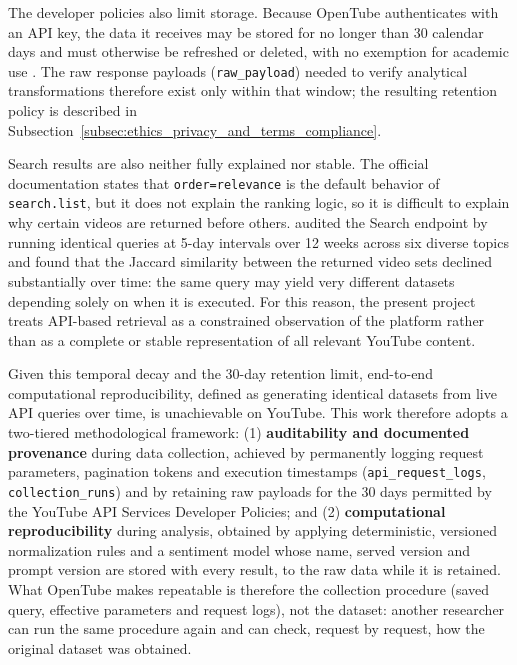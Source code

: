 The developer policies also limit storage. Because OpenTube authenticates with an API key, the data it receives may be stored for no longer than 30 calendar days and must otherwise be refreshed or deleted, with no exemption for academic use \autocite{youtube_api_services_developer_policies}. The raw response payloads (\texttt{raw\_payload}) needed to verify analytical transformations therefore exist only within that window; the resulting retention policy is described in Subsection~\ref{subsec:ethics_privacy_and_terms_compliance}.

Search results are also neither fully explained nor stable. The official documentation states that \texttt{order=relevance} is the default behavior of \texttt{search.\allowbreak list}, but it does not explain the ranking logic, so it is difficult to explain why certain videos are returned before others. \textcite{efstratiou2025youtube} audited the Search endpoint by running identical queries at 5-day intervals over 12 weeks across six diverse topics and found that the Jaccard similarity between the returned video sets declined substantially over time: the same query may yield very different datasets depending solely on when it is executed. For this reason, the present project treats API-based retrieval as a constrained observation of the platform rather than as a complete or stable representation of all relevant YouTube content.

Given this temporal decay and the 30-day retention limit, end-to-end computational reproducibility, defined as generating identical datasets from live API queries over time, is unachievable on YouTube. This work therefore adopts a two-tiered methodological framework: (1) \textbf{auditability and documented provenance} during data collection, achieved by permanently logging request parameters, pagination tokens and execution timestamps (\texttt{api\_request\_logs}, \texttt{collection\_runs}) and by retaining raw payloads for the 30 days permitted by the YouTube API Services Developer Policies; and (2) \textbf{computational reproducibility} during analysis, obtained by applying deterministic, versioned normalization rules and a sentiment model whose name, served version and prompt version are stored with every result, to the raw data while it is retained. What OpenTube makes repeatable is therefore the collection procedure (saved query, effective parameters and request logs), not the dataset: another researcher can run the same procedure again and can check, request by request, how the original dataset was obtained.
